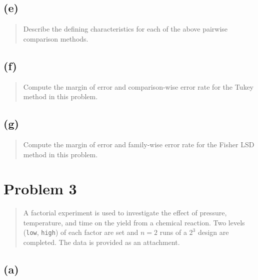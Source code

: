 \documentclass[
]{article}
\begin{document}
\hypertarget{e-1}{%
\subsection{(e)}\label{e-1}}

\begin{quote}
Describe the defining characteristics for each of the above pairwise
comparison methods.
\end{quote}

\vspace{50pt}

\hypertarget{f-1}{%
\subsection{(f)}\label{f-1}}

\begin{quote}
Compute the margin of error and comparison-wise error rate for the Tukey
method in this problem.
\end{quote}

\vspace{50pt}

\hypertarget{g}{%
\subsection{(g)}\label{g}}

\begin{quote}
Compute the margin of error and family-wise error rate for the Fisher
LSD method in this problem.
\end{quote}

\vspace{50pt}

\hypertarget{problem-3}{%
\section{Problem 3}\label{problem-3}}

\begin{quote}
A factorial experiment is used to investigate the effect of pressure,
temperature, and time on the yield from a chemical reaction. Two levels
(\texttt{low}, \texttt{high}) of each factor are set and \(n=2\) runs of
a \(2^3\) design are completed. The data is provided as an attachment.
\end{quote}

\vspace{50pt}

\hypertarget{a-2}{%
\subsection{(a)}\label{a-2}}
\end{document}
